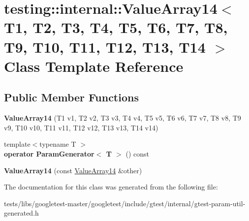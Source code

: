 \hypertarget{classtesting_1_1internal_1_1ValueArray14}{}\section{testing\+:\+:internal\+:\+:Value\+Array14$<$ T1, T2, T3, T4, T5, T6, T7, T8, T9, T10, T11, T12, T13, T14 $>$ Class Template Reference}
\label{classtesting_1_1internal_1_1ValueArray14}
\subsection*{Public Member Functions}
\begin{DoxyCompactItemize}
\item 
\mbox{\label{classtesting_1_1internal_1_1ValueArray14_a07a09d64aba1260d403adc661546ce48}} 
{\bfseries Value\+Array14} (T1 v1, T2 v2, T3 v3, T4 v4, T5 v5, T6 v6, T7 v7, T8 v8, T9 v9, T10 v10, T11 v11, T12 v12, T13 v13, T14 v14)
\item 
\mbox{\label{classtesting_1_1internal_1_1ValueArray14_aef77c9d7520c7313e2af66fd79185698}} 
{\footnotesize template$<$typename T $>$ }\\{\bfseries operator Param\+Generator$<$ T $>$} () const
\item 
\mbox{\label{classtesting_1_1internal_1_1ValueArray14_a41d4f0e6d12c86df58b24992a06300dc}} 
{\bfseries Value\+Array14} (const \hyperlink{classtesting_1_1internal_1_1ValueArray14}{Value\+Array14} \&other)
\end{DoxyCompactItemize}


The documentation for this class was generated from the following file\+:\begin{DoxyCompactItemize}
\item 
tests/libs/googletest-\/master/googletest/include/gtest/internal/gtest-\/param-\/util-\/generated.\+h\end{DoxyCompactItemize}
